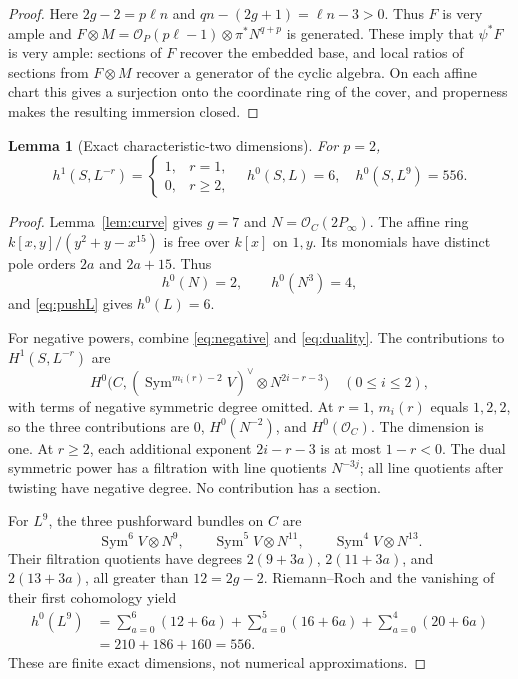 \documentclass[11pt,a4paper]{article}
\newcommand{\OO}{\mathcal O}
\newcommand{\Sym}{\operatorname{Sym}}
\newtheorem{lemma}[theorem]{Lemma}
\theoremstyle{definition}\newtheorem{definition}[theorem]{Definition}
\theoremstyle{remark}\newtheorem{remark}[theorem]{Remark}
\numberwithin{equation}{section}
\begin{document}
\begin{proof}
Here $2g-2=p\ell n$ and $qn-(2g+1)=\ell n-3>0$. Thus $F$ is very ample and $F\otimes M=\OO_P(p\ell-1)\otimes\pi^*N^{q+p}$ is generated. These imply that $\psi^*F$ is very ample: sections of $F$ recover the embedded base, and local ratios of sections from $F\otimes M$ recover a generator of the cyclic algebra. On each affine chart this gives a surjection onto the coordinate ring of the cover, and properness makes the resulting immersion closed.
\end{proof}

\begin{lemma}[Exact characteristic-two dimensions]\label{lem:dimensions}
For $p=2$,
\[
 h^1(S,L^{-r})=\begin{cases}1,&r=1,\\0,&r\ge2,\end{cases}
 \quad h^0(S,L)=6,\quad h^0(S,L^9)=556.
\]
\end{lemma}
\begin{proof}
Lemma~\ref{lem:curve} gives $g=7$ and $N=\OO_C(2P_\infty)$. The affine ring $k[x,y]/(y^2+y-x^{15})$ is free over $k[x]$ on $1,y$. Its monomials have distinct pole orders $2a$ and $2a+15$. Thus
\[
 h^0(N)=2,\qquad h^0(N^3)=4,
\]
and \eqref{eq:pushL} gives $h^0(L)=6$.

For negative powers, combine \eqref{eq:negative} and \eqref{eq:duality}. The contributions to $H^1(S,L^{-r})$ are
\[
 H^0\bigl(C,(\Sym^{m_i(r)-2}V)^\vee\otimes N^{2i-r-3}\bigr)
 \quad(0\le i\le2),
\]
with terms of negative symmetric degree omitted. At $r=1$, $m_i(r)$ equals $1,2,2$, so the three contributions are $0$, $H^0(N^{-2})$, and $H^0(\OO_C)$. The dimension is one. At $r\ge2$, each additional exponent $2i-r-3$ is at most $1-r<0$. The dual symmetric power has a filtration with line quotients $N^{-3j}$; all line quotients after twisting have negative degree. No contribution has a section.

For $L^9$, the three pushforward bundles on $C$ are
\[
 \Sym^6V\otimes N^9,\qquad
 \Sym^5V\otimes N^{11},\qquad
 \Sym^4V\otimes N^{13}.
\]
Their filtration quotients have degrees $2(9+3a)$, $2(11+3a)$, and $2(13+3a)$, all greater than $12=2g-2$. Riemann--Roch and the vanishing of their first cohomology yield
\begin{align*}
 h^0(L^9)
 &=\sum_{a=0}^{6}(12+6a)+\sum_{a=0}^{5}(16+6a)
                      +\sum_{a=0}^{4}(20+6a)\\
 &=210+186+160=556.
\end{align*}
These are finite exact dimensions, not numerical approximations.
\end{proof}
\end{document}
